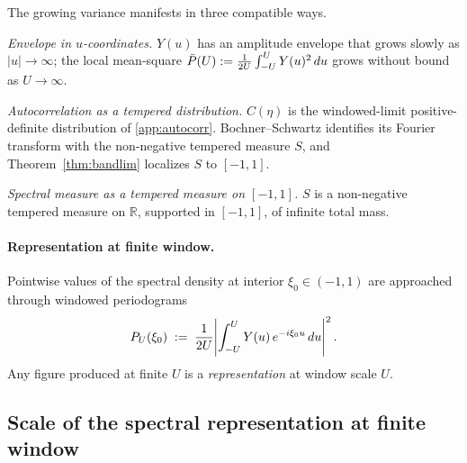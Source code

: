 \documentclass{article}
\newcommand{\assign}{:=}
\newcommand{\tmem}[1]{{\em #1\/}}
\begin{document}
The growing variance manifests in three compatible ways.

{\tmem{Envelope in $u$-coordinates.}} $Y (u)$ has an amplitude envelope that
grows slowly as $|u| \to \infty$; the local mean-square $\bar{P} (U) \assign
\tfrac{1}{2 U} \int_{- U}^U Y (u)^2  \hspace{0.17em} du$ grows without bound
as $U \to \infty$.

{\tmem{Autocorrelation as a tempered distribution.}} $C (\eta)$ is the
windowed-limit positive-definite distribution of
{\textsection}\ref{app:autocorr}. Bochner--Schwartz identifies its Fourier
transform with the non-negative tempered measure $S$, and
Theorem~\ref{thm:bandlim} localizes $S$ to $[- 1, 1]$.

{\tmem{Spectral measure as a tempered measure on $[- 1, 1]$.}} $S$ is a
non-negative tempered measure on $\mathbb{R}$, supported in $[- 1, 1]$, of
infinite total mass.

\paragraph{Representation at finite window.} Pointwise values of the spectral
density at interior $\xi_0 \in (- 1, 1)$ are approached through windowed
periodograms
\[ P_U (\xi_0) \hspace{0.27em} \assign \hspace{0.27em} \frac{1}{2 U}
   \hspace{-0.17em} \left| \int_{- U}^U Y (u) \hspace{0.17em} e^{- i \xi_0 u} 
   \hspace{0.17em} du \right|^2 . \]
Any figure produced at finite $U$ is a {\tmem{representation}} at window scale
$U$.

\subsection{Scale of the spectral representation at finite
window}\label{app:windowscale}
\end{document}
